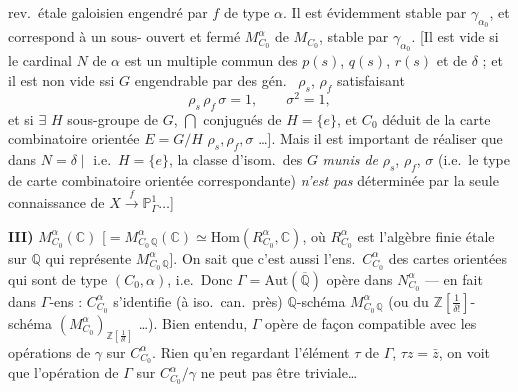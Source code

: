 \documentclass[11pt,a4paper]{article}
\begin{document}

rev.\ étale galoisien  engendré par $f$  de type $\alpha$. Il est évidemment stable par $\gamma_{\alpha_0}$, et correspond à un sous-\struck{\ill{}} ouvert et fermé $M^{\alpha}_{C_0}$ de $M_{C_0}$, stable par $\gamma_{\alpha_0}$. [Il est vide  si le cardinal $N$ de $\alpha$ est un multiple commun des $p(s)$, $q(s)$, $r(s)$ et de $\delta$ ; \struck{\ill{}} et il est non vide ssi \struck{$\exists$} $G$   engendrable par des gén.\ \struck{$\rho$, $\sigma$} $\rho_s$, $\rho_f$ \add{$\sigma$} satisfaisant
\[
  \rho_s\,\rho_f\,\sigma = 1, \qquad \sigma^2 = 1,
\]
et si \struck{$\exists$} $\exists$ $H$ sous-groupe de $G$,  $\bigcap$ conjugués de $H = \{e\}$, et $C_0$ déduit de la carte combinatoire orientée $E = G/H$ \ill{} $\rho_s, \rho_f, \sigma$ \ill{} \ldots]. Mais il est important de réaliser que dans  $N = \delta \mid$ i.e.\ $H = \{e\}$, la classe d'isom.\ des $G$ \emph{munis de} $\rho_s$, $\rho_f$, $\sigma$ (i.e.\ le type de carte combinatoire orientée correspondante) \emph{n'est pas} déterminée par la seule connaissance de $X \xrightarrow{f} \mathbb{P}^1_{\Gamma} \ldots$]


\textbf{III)}   $M^{\alpha}_{C_0}(\mathbb{C})$ [$= M^{\alpha}_{C_0\,\mathbb{Q}}(\mathbb{C}) \simeq \mathrm{Hom}(R^{\alpha}_{C_0}, \mathbb{C})$, où $R^{\alpha}_{C_0}$ est l'algèbre finie étale sur $\mathbb{Q}$ qui représente $M^{\alpha}_{C_0\,\mathbb{Q}}$]. On sait que c'est aussi l'ens.\ $C^{\alpha}_{C_0}$ des  cartes  orientées qui sont de type $(C_0, \alpha)$, i.e.\ Donc $\Gamma = \mathrm{Aut}(\overline{\mathbb{Q}})$ opère dans $N^{\alpha}_{C_0}$ --- en fait  \struck{\ill{}} dans $\Gamma$-ens :  $C^{\alpha}_{C_0}$ s'identifie \ill{} (à iso.\ can.\ près) \ill{} $\mathbb{Q}$-schéma $M^{\alpha}_{C_0\,\mathbb{Q}}$ (ou du $\mathbb{Z}[\frac{1}{\delta!}]$-schéma $(M^{\alpha}_{C_0})_{\mathbb{Z}[\frac{1}{\delta!}]}$ \ldots). Bien entendu, $\Gamma$ opère de façon compatible  avec les opérations de $\gamma$ sur $C^{\alpha}_{C_0}$. Rien qu'en regardant l'élément $\tau$ de $\Gamma$, $\tau z = \bar z$, on voit que l'opération de $\Gamma$ sur $C^{\alpha}_{C_0}/\gamma$ ne peut pas être triviale\ldots
\end{document}
